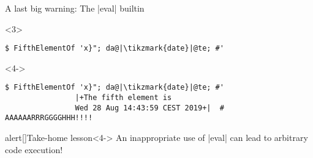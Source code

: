 \begin{frame}[fragile]{A last big warning: The \bash|eval| builtin}
\begin{overlayarea}{\textwidth}{0.6\textheight}
\begin{onlyenv}
        \end{onlyenv}
        \begin{onlyenv}<3>
            \begin{lstlisting}[style=MyBash, emph={[7]_fifth_array}, aboveskip=2mm, firstnumber=10]
                $ FifthElementOf 'x}"; da@|\tikzmark{date}|@te; #'
            \end{lstlisting}
        \end{onlyenv}
        \begin{onlyenv}<4->
            \begin{lstlisting}[style=MyBash, emph={[7]_fifth_array}, aboveskip=2mm, firstnumber=10]
                $ FifthElementOf 'x}"; da@|\tikzmark{date}|@te; #'
                |+The fifth element is
                Wed 28 Aug 14:43:59 CEST 2019+|  # AAAAAARRRGGGGHHH!!!!
            \end{lstlisting}
        \end{onlyenv}
    \end{overlayarea}
    {\Large\begin{varblock}{alert}[\textwidth]{Take-home lesson}<4->
        An inappropriate use of \bash|eval| can lead to \alert{arbitrary code execution}!
    \end{varblock}}
    \PrepareURLsymbol[PB]
\end{frame}






